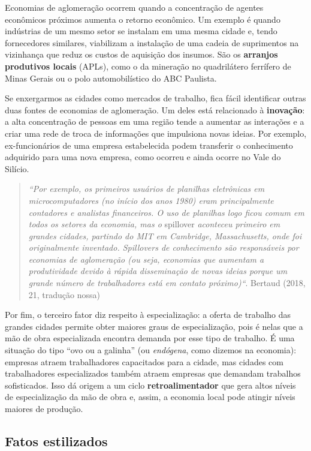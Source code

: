 \documentclass[
  12pt,
  a4paper,
]{article}
\begin{document}
Economias de aglomeração ocorrem quando a concentração de agentes
econômicos próximos aumenta o retorno econômico. Um exemplo é quando
indústrias de um mesmo setor se instalam em uma mesma cidade e, tendo
fornecedores similares, viabilizam a instalação de uma cadeia de
suprimentos na vizinhança que reduz os custos de aquisição dos insumos.
São os \textbf{arranjos produtivos locais} (APLs), como o da mineração
no quadrilátero ferrífero de Minas Gerais ou o polo automobilístico do
ABC Paulista.

Se enxergarmos as cidades como mercados de trabalho, fica fácil
identificar outras duas fontes de economias de aglomeração. Um deles
está relacionado à \textbf{inovação}: a alta concentração de pessoas em
uma região tende a aumentar as interações e a criar uma rede de troca de
informações que impulsiona novas ideias. Por exemplo, ex-funcionários de
uma empresa estabelecida podem transferir o conhecimento adquirido para
uma nova empresa, como ocorreu e ainda ocorre no Vale do Silício.

\begin{quote}
\emph{``Por exemplo, os primeiros usuários de planilhas eletrônicas em
microcomputadores (no início dos anos 1980) eram principalmente
contadores e analistas financeiros. O uso de planilhas logo ficou comum
em todos os setores da economia, mas o} spillover \emph{aconteceu
primeiro em grandes cidades, partindo do MIT em Cambridge,
Massachusetts, onde foi originalmente inventado. Spillovers de
conhecimento são responsáveis por economias de aglomeração (ou seja,
economias que aumentam a produtividade devido à rápida disseminação de
novas ideias porque um grande número de trabalhadores está em contato
próximo)``}. Bertaud (2018, 21, tradução nossa)
\end{quote}

Por fim, o terceiro fator diz respeito à especialização: a oferta de
trabalho das grandes cidades permite obter maiores graus de
especialização, pois é nelas que a mão de obra especializada encontra
demanda por esse tipo de trabalho. É uma situação do tipo ``ovo ou a
galinha'' (ou \emph{endógena}, como dizemos na economia): empresas
atraem trabalhadores capacitados para a cidade, mas cidades com
trabalhadores especializados também atraem empresas que demandam
trabalhos sofisticados. Isso dá origem a um ciclo
\textbf{retroalimentador} que gera altos níveis de especialização da mão
de obra e, assim, a economia local pode atingir níveis maiores de
produção.

\hypertarget{fatos-estilizados}{%
\subsection{Fatos estilizados}\label{fatos-estilizados}}
\end{document}

